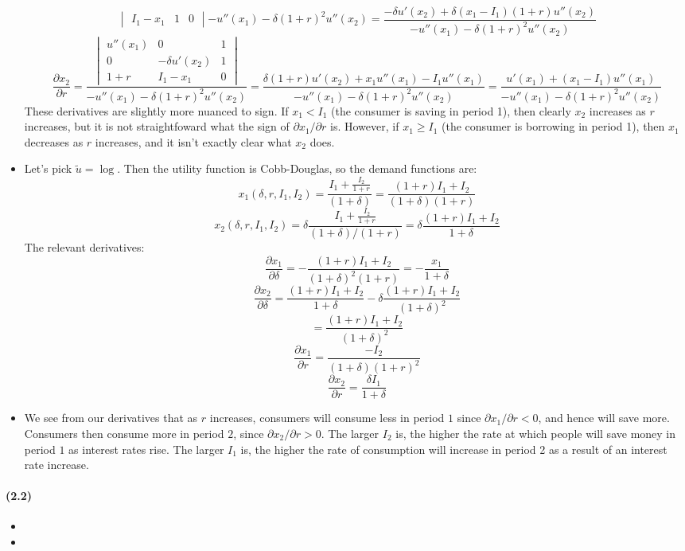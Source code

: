 \documentclass[10pt,letter]{article}
\begin{document}
\begin{itemize}
\[{\begin{vmatrix}
I_1-x_1 & 1 & 0
\end{vmatrix}}{- u''(x_1)- \delta (1+r)^2u''(x_2)} = \frac{-\delta u'(x_2) + \delta (x_1 - I_1)(1+r) u''(x_2) }{- u''(x_1)- \delta (1+r)^2u''(x_2)} \]
\[ \frac{\partial x_2}{\partial r} = \frac{\begin{vmatrix}
u''(x_1) & 0 & 1 \\
0 &  -\delta u'(x_2) & 1 \\
1+r & I_1-x_1 & 0
\end{vmatrix}}{- u''(x_1)- \delta (1+r)^2u''(x_2)} = \frac{\delta (1+r) u'(x_2) +  x_1 u''(x_1) - I_1 u''(x_1)}{- u''(x_1)- \delta (1+r)^2u''(x_2)} = \frac{u'(x_1) +  (x_1-I_1) u''(x_1)}{- u''(x_1)- \delta (1+r)^2u''(x_2)}\]
These derivatives are slightly more nuanced to sign. If $x_1 < I_1$ (the consumer is saving in period 1), then clearly $x_2$ increases as $r$ increases, but it is not straightfoward what the sign of $\partial x_1 /\partial r$ is. However, if $x_1 \ge I_1$ (the consumer is borrowing in period 1), then $x_1$ decreases as $r$ increases, and it isn't exactly clear what $x_2$ does.
\item Let's pick $\tilde{u} = \log$. Then the utility function is Cobb-Douglas, so the demand functions are:
\[ x_1(\delta, r, I_1, I_2) = \frac{I_1 + \frac{I_2}{1+r}}{(1+\delta)} = \frac{(1+r)I_1 + I_2}{(1+\delta)(1+r)} \]
\[ x_2(\delta, r, I_1, I_2) = \delta \frac{I_1 + \frac{I_2}{1+r}}{(1+\delta)/(1+r)}= \delta \frac{(1+r) I_1 + I_2}{1 + \delta} \]
The relevant derivatives:
\[ \frac{\partial x_1}{\partial \delta} = - \frac{(1+r)I_1 + I_2}{(1+\delta)^2(1+r)} = -\frac{x_1}{1+\delta}\]
\[ \frac{\partial x_2}{\partial \delta} = \frac{(1+r) I_1 + I_2}{1 + \delta} - \delta \frac{(1+r) I_1 + I_2}{(1 + \delta)^2} \]
\[ = \frac{(1+r) I_1 + I_2}{(1 + \delta)^2} \]
\[ \frac{\partial x_1}{\partial r} = \frac{ - I_2}{(1+\delta)(1+r)^2} \]
\[ \frac{\partial x_2}{\partial r} = \frac{\delta I_1}{1+\delta} \]
\item We see from our derivatives that as $r$ increases, consumers will consume less in period $1$ since $\partial x_1 / \partial r < 0$, and hence will save more. Consumers then consume more in period $2$, since $\partial x_2 / \partial r > 0$. The larger $I_2$ is, the higher the rate at which people will save money in period $1$ as interest rates rise. The larger $I_1$ is, the higher the rate of consumption will increase in period 2 as a result of an interest rate increase.
\end{itemize}
\paragraph{(2.2)}
\begin{itemize}
\item
\item
\end{itemize}
\end{document}
